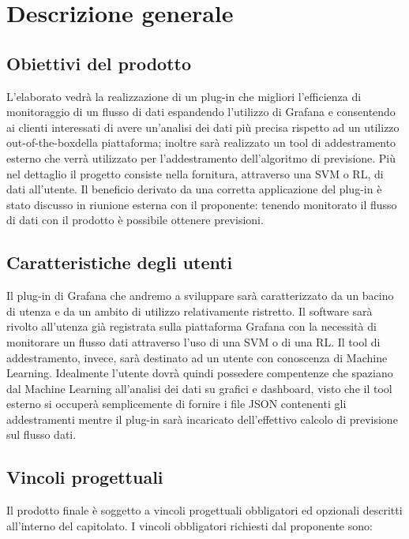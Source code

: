 \section{Descrizione generale}
   
	\subsection{Obiettivi del prodotto}
	L’elaborato vedrà la realizzazione di un plug-in che migliori l’efficienza di monitoraggio di un flusso di dati espandendo l’utilizzo di Grafana e consentendo ai clienti interessati di avere un’analisi dei dati più precisa rispetto ad un utilizzo out-of-the-box\glo della piattaforma; inoltre sarà realizzato un tool di addestramento esterno che verrà utilizzato per l'addestramento dell'algoritmo di previsione. Più nel dettaglio il progetto consiste nella fornitura, attraverso una SVM o RL, di dati all’utente. Il beneficio derivato da una corretta applicazione del plug-in è stato discusso in riunione esterna con il proponente: tenendo monitorato il flusso di dati con il prodotto è possibile ottenere previsioni. 
	\subsection{Caratteristiche degli utenti}
	Il plug-in di Grafana che andremo a sviluppare sarà caratterizzato da un bacino di utenza e da un ambito di utilizzo relativamente ristretto.
Il software sarà rivolto all’utenza già registrata sulla piattaforma Grafana con la necessità di monitorare un flusso dati attraverso l’uso di una SVM o di una RL. Il tool di addestramento, invece, sarà destinato ad un utente con conoscenza di Machine Learning. Idealmente l'utente dovrà quindi possedere compentenze che spaziano dal Machine Learning all'analisi dei dati su grafici e dashboard, visto che il tool esterno si occuperà semplicemente di fornire i file JSON contenenti gli addestramenti mentre il plug-in sarà incaricato dell'effettivo calcolo di previsione sul flusso dati.


	 \subsection{Vincoli progettuali}
	 Il prodotto finale è soggetto a vincoli progettuali obbligatori ed opzionali descritti all’interno del capitolato. I vincoli obbligatori richiesti dal proponente sono:

